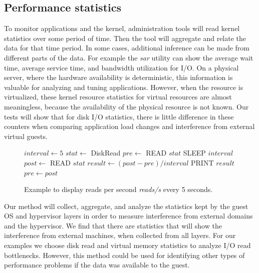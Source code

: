 \subsection{Performance statistics}
To monitor applications and the kernel, administration tools will read kernel statistics over some period of time.  Then the tool will aggregate and relate the data for that time period.  In some cases, additional inference can be made from different parts of the data.  For example the \emph{sar} utility can show the average wait time, average service time, and bandwidth utilization for I/O.  On a physical server, where the hardware availability is deterministic, this information is valuable for analyzing and tuning applications.  However, when the resource is virtualized, these kernel resource statistics for virtual resources are almost meaningless, because the availability of the physical resource is not known.  Our tests will show that for disk I/O statistics, there is little difference in these counters when comparing application load changes and interference from external virtual guests. 

\begin{figure}[h]
\begin{algorithmic}[H]
 \STATE $interval \gets 5$
 \STATE $stat \gets$  DiskRead       
 \STATE $pre \gets $ READ $stat$ 
 \LOOP
    \STATE SLEEP $interval$
    \STATE $post \gets$ READ $stat$
    \STATE $result \gets (post - pre)/interval$
    \STATE PRINT  $result$
    \STATE $pre \gets post$ 
 \ENDLOOP
\end{algorithmic}
\caption{Example to display reads per second \emph{reads/s} every 5 seconds.}
\label{alg1}
\end{figure}

Our method will collect, aggregate, and analyze the statistics kept by the guest OS and hypervisor layers in order to measure interference from external domains and the hypervisor.  We find that there are statistics that will show the interference from external machines, when collected from all layers.  For our examples we choose disk read and virtual memory statistics to analyze I/O read bottlenecks.  However, this method could be used for identifying other types of performance problems if the data was available to the guest.

